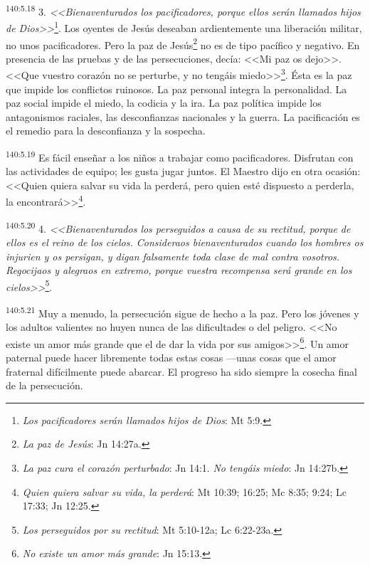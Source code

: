 \par 
\textsuperscript{140:5.18} 3. \textit{<<Bienaventurados los pacificadores, porque ellos serán llamados hijos de Dios>>}\footnote{\textit{Los pacificadores serán llamados hijos de Dios}: Mt 5:9.}. Los oyentes de Jesús deseaban ardientemente una liberación militar, no unos pacificadores. Pero la paz de Jesús\footnote{\textit{La paz de Jesús}: Jn 14:27a.} no es de tipo pacífico y negativo. En presencia de las pruebas y de las persecuciones, decía: <<Mi paz os dejo>>. <<Que vuestro corazón no se perturbe, y no tengáis miedo>>\footnote{\textit{La paz cura el corazón perturbado}: Jn 14:1. \textit{No tengáis miedo}: Jn 14:27b.}. Ésta es la paz que impide los conflictos ruinosos. La paz personal integra la personalidad. La paz social impide el miedo, la codicia y la ira. La paz política impide los antagonismos raciales, las desconfianzas nacionales y la guerra. La pacificación es el remedio para la desconfianza y la sospecha.

\par 
\textsuperscript{140:5.19} Es fácil enseñar a los niños a trabajar como pacificadores. Disfrutan con las actividades de equipo; les gusta jugar juntos. El Maestro dijo en otra ocasión: <<Quien quiera salvar su vida la perderá, pero quien esté dispuesto a perderla, la encontrará>>\footnote{\textit{Quien quiera salvar su vida, la perderá}: Mt 10:39; 16:25; Mc 8:35; 9:24; Lc 17:33; Jn 12:25.}.

\par 
\textsuperscript{140:5.20} 4. \textit{<<Bienaventurados los perseguidos a causa de su rectitud, porque de ellos es el reino de los cielos. Consideraos bienaventurados cuando los hombres os injurien y os persigan, y digan falsamente toda clase de mal contra vosotros. Regocijaos y alegraos en extremo, porque vuestra recompensa será grande en los cielos>>}\footnote{\textit{Los perseguidos por su rectitud}: Mt 5:10-12a; Lc 6:22-23a.}.

\par 
\textsuperscript{140:5.21} Muy a menudo, la persecución sigue de hecho a la paz. Pero los jóvenes y los adultos valientes no huyen nunca de las dificultades o del peligro. <<No existe un amor más grande que el de dar la vida por sus amigos>>\footnote{\textit{No existe un amor más grande}: Jn 15:13.}. Un amor paternal puede hacer libremente todas estas cosas ---unas cosas que el amor fraternal difícilmente puede abarcar. El progreso ha sido siempre la cosecha final de la persecución.

